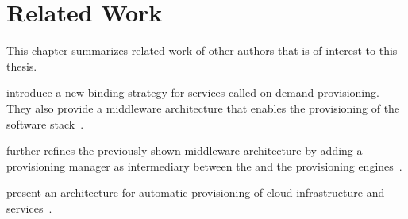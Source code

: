 \chapter{Related Work}

This chapter summarizes related work of other authors that is of interest to this thesis.

\citeauthor{provisioning:ondemand} introduce a new binding strategy for services called on-demand provisioning. They also provide a middleware architecture that enables the provisioning of the software stack~\autocite{provisioning:ondemand}.

\citeauthor{provisioning:dynamic} further refines the previously shown middleware architecture by adding a provisioning manager as intermediary between the  and the provisioning engines~\autocite{provisioning:dynamic}.

\citeauthor{provisioning:architecture} present an architecture for automatic provisioning of cloud infrastructure and services~\autocite{provisioning:architecture}.
